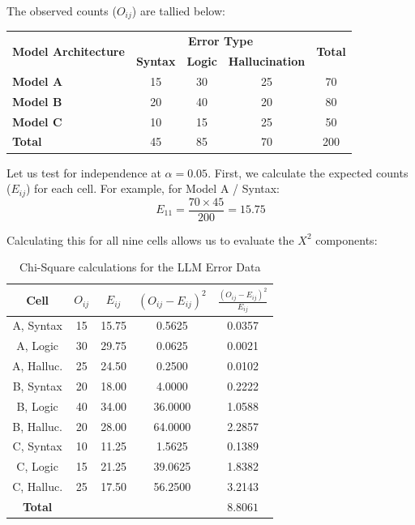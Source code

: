\documentclass{article}
\begin{document}
The observed counts ($O_{ij}$) are tallied below:

\begin{table}[h]
\centering
\begin{tabular}{l|ccc|c}
\hline
\multirow{2}{*}{\textbf{Model Architecture}} & \multicolumn{3}{c|}{\textbf{Error Type}} & \multirow{2}{*}{\textbf{Total}} \\
 & \textbf{Syntax} & \textbf{Logic} & \textbf{Hallucination} & \\ \hline
\textbf{Model A} & 15 & 30 & 25 & 70 \\
\textbf{Model B} & 20 & 40 & 20 & 80 \\
\textbf{Model C} & 10 & 15 & 25 & 50 \\ \hline
\textbf{Total} & 45 & 85 & 70 & 200 \\ \hline \hline
\end{tabular}
\end{table}

Let us test for independence at $\alpha = 0.05$. First, we calculate the expected counts ($E_{ij}$) for each cell. For example, for Model A / Syntax:
$$ E_{11} = \frac{70 \times 45}{200} = 15.75 $$

Calculating this for all nine cells allows us to evaluate the $X^2$ components:

\begin{table}[h]
\centering
\begin{tabular}{ccccc}
\hline
\textbf{Cell} & $O_{ij}$ & $E_{ij}$ & $(O_{ij} - E_{ij})^2$ & $\frac{(O_{ij} - E_{ij})^2}{E_{ij}}$ \\ \hline
A, Syntax & 15 & 15.75 & 0.5625 & 0.0357 \\
A, Logic & 30 & 29.75 & 0.0625 & 0.0021 \\
A, Halluc. & 25 & 24.50 & 0.2500 & 0.0102 \\
B, Syntax & 20 & 18.00 & 4.0000 & 0.2222 \\
B, Logic & 40 & 34.00 & 36.0000 & 1.0588 \\
B, Halluc. & 20 & 28.00 & 64.0000 & 2.2857 \\
C, Syntax & 10 & 11.25 & 1.5625 & 0.1389 \\
C, Logic & 15 & 21.25 & 39.0625 & 1.8382 \\
C, Halluc. & 25 & 17.50 & 56.2500 & 3.2143 \\ \hline
\textbf{Total} & & & & $\mathbf{8.8061}$ \\ \hline \hline
\end{tabular}
\caption{\label{tab:chisq_llm} Chi-Square calculations for the LLM Error Data}
\end{table}
\end{document}
